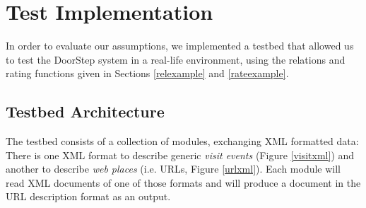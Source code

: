 \documentclass[a4paper]{danarticle}
\theoremstyle{remark}
\begin{document}
  \section{Test Implementation}
      In order to evaluate our assumptions, we implemented a testbed that 
      allowed us to test the DoorStep system in a real-life environment, using 
      the relations and rating functions given in Sections \ref{relexample} and
      \ref{rateexample}.
    \subsection{Testbed Architecture}
      The testbed consists of a collection of modules, exchanging XML formatted 
      data: There is one XML format to describe generic \textit{visit events} 
      (Figure \ref{visitxml}) and another to describe \textit{web 
      places} (i.e. URLs, Figure \ref{urlxml}). Each module will read XML 
      documents of one of those formats and will produce a document in the URL 
      description format as an output.
      
\end{document}

